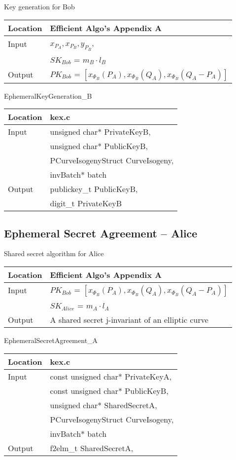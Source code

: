 \documentclass[10pt]{article}
\begin{document}
	\parbox[t]{.35\linewidth}{
	\centering
	Key generation for Bob
	\begin{tabular}{@{}ll@{}}
		\toprule
		Location & Efficient Algo's Appendix A \\
		\midrule
		Input & $x_{P_{A}}, x_{P_{B}}, y_{P_{B}}$,\\
		& $SK_{Bob}$ = $m_{B} \cdot l_{B}$\\
		\midrule
		Output & $PK_{Bob}$ = $[x_{\Phi_{B}}(P_{A}), x_{\Phi_{B}}(Q_{A}), x_{\Phi_{B}}(Q_{A} - P_{A})]$\\
		\bottomrule
	\end{tabular}}
	\hfill
	\parbox[t]{.35\linewidth}{
	\centering
	EphemeralKeyGeneration\_B
	\begin{tabular}{@{}ll@{}}
		\toprule
		Location & kex.c \\
		\midrule
		Input & unsigned char* PrivateKeyB,\\
		& unsigned char* PublicKeyB,\\
		& PCurveIsogenyStruct CurveIsogeny,\\
		& invBatch* batch\\
		\midrule
		Output & publickey\_t PublicKeyB,\\
		& digit\_t PrivateKeyB\\
		\bottomrule
	\end{tabular}}

\subsection{Ephemeral Secret Agreement -- Alice}

	\parbox[t]{.35\linewidth}{
	\centering
	Shared secret algorithm for Alice
	\begin{tabular}{@{}ll@{}}
		\toprule
		Location & Efficient Algo's Appendix A \\
		\midrule
		Input & $PK_{Bob}$ = $[x_{\Phi_{B}}(P_{A}), x_{\Phi_{B}}(Q_{A}), x_{\Phi_{B}}(Q_{A} - P_{A})]$\\
		& $SK_{Alice}$ = $m_{A} \cdot l_{A}$\\
		\midrule
		Output & A shared secret j-invariant of an elliptic curve\\
		\bottomrule
	\end{tabular}}
	\hfill
	\parbox[t]{.35\linewidth}{
	\centering
	EphemeralSecretAgreement\_A
	\begin{tabular}{@{}ll@{}}
		\toprule
		Location & kex.c \\
		\midrule
		Input & const unsigned char* PrivateKeyA,\\
		& const unsigned char* PublicKeyB,\\
		& unsigned char* SharedSecretA,\\
		& PCurveIsogenyStruct CurveIsogeny,\\
		& invBatch* batch\\
		\midrule
		Output & f2elm\_t SharedSecretA,\\
		\bottomrule
	\end{tabular}}
\end{document}
